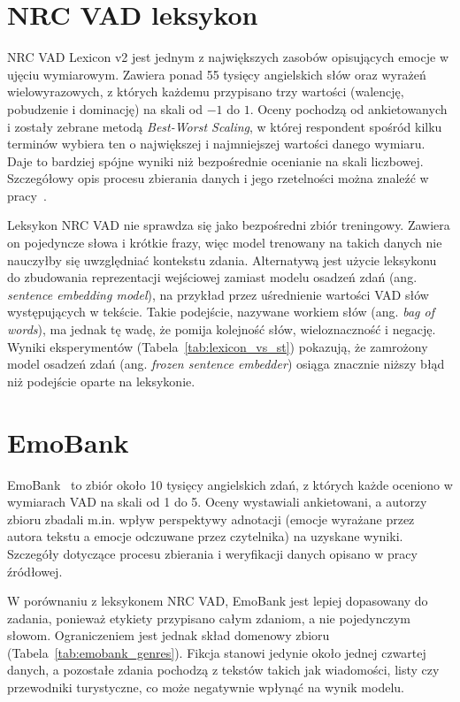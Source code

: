 \section{NRC VAD leksykon}
\label{sec:nrc_vad}
NRC VAD Lexicon v2 jest jednym z największych zasobów opisujących emocje w ujęciu wymiarowym.
Zawiera ponad 55 tysięcy angielskich słów oraz wyrażeń wielowyrazowych, z których każdemu
przypisano trzy wartości (walencję, pobudzenie i dominację) na skali od $-1$ do $1$. Oceny
pochodzą od ankietowanych i zostały zebrane metodą \textit{Best-Worst Scaling}, w której
respondent spośród kilku terminów wybiera ten o największej i najmniejszej wartości danego
wymiaru. Daje to bardziej spójne wyniki niż bezpośrednie ocenianie na skali liczbowej.
Szczegółowy opis procesu zbierania danych i jego rzetelności można znaleźć w
pracy~\cite{mohammad2025nrcvadlexiconv2}.

Leksykon NRC VAD nie sprawdza się jako bezpośredni zbiór treningowy. Zawiera on pojedyncze słowa
i krótkie frazy, więc model trenowany na takich danych nie nauczyłby się uwzględniać kontekstu
zdania. Alternatywą jest użycie leksykonu do zbudowania reprezentacji wejściowej zamiast modelu
osadzeń zdań (ang. \textit{sentence embedding model}), na przykład przez uśrednienie wartości
VAD słów występujących w tekście. Takie podejście, nazywane workiem słów (ang. \textit{bag of
words}), ma jednak tę wadę, że pomija kolejność słów, wieloznaczność i negację. Wyniki
eksperymentów (Tabela~\ref{tab:lexicon_vs_st}) pokazują, że zamrożony model osadzeń zdań (ang.
\textit{frozen sentence embedder}) osiąga znacznie niższy błąd niż podejście oparte na
leksykonie. %

\section{EmoBank}
EmoBank~\cite{buechel-hahn-2017-emobank} to zbiór około 10 tysięcy angielskich zdań, z których
każde oceniono w wymiarach VAD na skali od 1 do 5. Oceny wystawiali ankietowani, a autorzy
zbioru zbadali m.in. wpływ perspektywy adnotacji (emocje wyrażane przez autora tekstu a emocje
odczuwane przez czytelnika) na uzyskane wyniki. Szczegóły dotyczące procesu zbierania i
weryfikacji danych opisano w pracy źródłowej.

W porównaniu z leksykonem NRC VAD, EmoBank jest lepiej dopasowany do zadania, ponieważ etykiety
przypisano całym zdaniom, a nie pojedynczym słowom. Ograniczeniem jest jednak skład domenowy
zbioru (Tabela~\ref{tab:emobank_genres}). Fikcja stanowi jedynie około jednej czwartej danych,
a pozostałe zdania pochodzą z tekstów takich jak wiadomości, listy czy przewodniki turystyczne,
co może negatywnie wpłynąć na wynik modelu.


